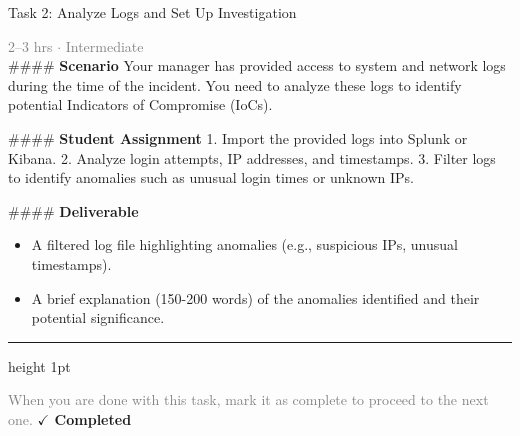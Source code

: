 \documentclass[10pt,a4paper]{article}
\begin{document}
\begin{taskbox}{Task 2: Analyze Logs and Set Up Investigation}

    {\small \textcolor{gray}{2--3 hrs $\cdot$ Intermediate}}\\[12pt]

    \#\#\#\# \textbf{Scenario}  
Your manager has provided access to system and network logs during the time of the incident. You need to analyze these logs to identify potential Indicators of Compromise (IoCs).

\#\#\#\# \textbf{Student Assignment}  
1. Import the provided logs into Splunk or Kibana.  
2. Analyze login attempts, IP addresses, and timestamps.  
3. Filter logs to identify anomalies such as unusual login times or unknown IPs.  

\#\#\#\# \textbf{Deliverable}  
\begin{itemize}
    \item A filtered log file highlighting anomalies (e.g., suspicious IPs, unusual timestamps).  
    \item A brief explanation (150-200 words) of the anomalies identified and their potential significance.\par
\end{itemize}

    \vspace{16pt}

    \textcolor{cardBorder}{\hrule height 1pt}\vspace{8pt}

    \small \textcolor{gray}{When you are done with this task, mark it as complete to proceed to the next one.} \hfill \textbf{\textcolor{brandDark}{$\checkmark$ Completed}}

\end{taskbox}
\end{document}
